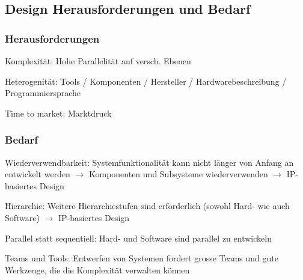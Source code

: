 \begin{multicols}{2}
    \subsection{Design Herausforderungen und Bedarf}
    \subsubsection{Herausforderungen}
    \begin{compactitem}
        \item Komplexität: Hohe Parallelität auf versch. Ebenen
        \item Heterogenität: Tools / Komponenten / Hersteller / Hardwarebeschreibung / Programmiersprache
        \item Time to market: Marktdruck
    \end{compactitem}
    \subsubsection{Bedarf}
    \begin{compactitem}
        \item Wiederverwendbarkeit: Systemfunktionalität kann nicht länger von Anfang an entwickelt werden $\rightarrow$ Komponenten und Subsysteme wiederverwenden $\rightarrow$ IP-basiertes Design
        \item Hierarchie: Weitere Hierarchiestufen sind erforderlich (sowohl Hard- wie auch Software) $\rightarrow$ IP-basiertes Design
        \item Parallel statt sequentiell: Hard- und Software sind parallel zu entwickeln
        \item Teams und Tools: Entwerfen von Systemen fordert grosse Teams und gute Werkzeuge, die die Komplexität verwalten können
    \end{compactitem}

    \ \\ \ \\
\end{multicols}

